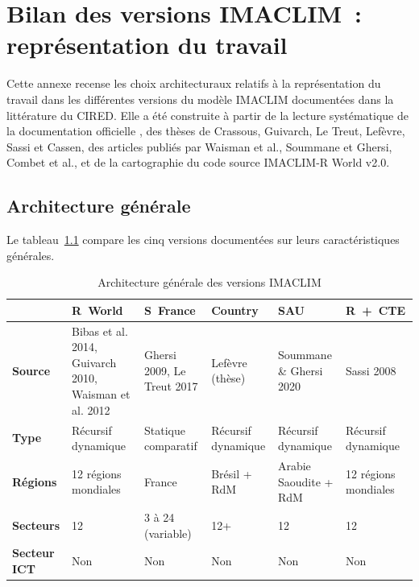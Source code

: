
\chapter{Bilan des versions IMACLIM~: représentation du travail}\label{ch:annexe-imaclim}

Cette annexe recense les choix architecturaux relatifs à la représentation du travail dans les différentes versions du modèle IMACLIM documentées dans la littérature du CIRED. Elle a été construite à partir de la lecture systématique de la documentation officielle \parencite{bibas_imaclim_2014}, des thèses de Crassous, Guivarch, Le Treut, Lefèvre, Sassi et Cassen, des articles publiés par Waisman et al., Soummane et Ghersi, Combet et al., et de la cartographie du code source IMACLIM-R World v2.0.

\section{Architecture générale}

Le tableau~\ref{tab:imaclim-archi} compare les cinq versions documentées sur leurs caractéristiques générales.

\begin{table}[htbp]
\centering
\caption{Architecture générale des versions IMACLIM}\label{tab:imaclim-archi}
\small
\begin{tabular}{p{2.8cm}p{2.2cm}p{2.2cm}p{2.2cm}p{2.2cm}p{2.2cm}}
\toprule
 & \textbf{R~World} & \textbf{S~France} & \textbf{Country} & \textbf{SAU} & \textbf{R~+~CTE} \\
\midrule
\textbf{Source} & Bibas et al. 2014, Guivarch 2010, Waisman et al. 2012 & Ghersi 2009, Le Treut 2017 & Lefèvre (thèse) & Soummane \& Ghersi 2020 & Sassi 2008 \\
\addlinespace
\textbf{Type} & Récursif dynamique & Statique comparatif & Récursif dynamique & Récursif dynamique & Récursif dynamique \\
\addlinespace
\textbf{Régions} & 12 régions mondiales & France & Brésil + RdM & Arabie Saoudite + RdM & 12 régions mondiales \\
\addlinespace
\textbf{Secteurs} & 12 & 3 à 24 (variable) & 12+ & 12 & 12 \\
\addlinespace
\textbf{Secteur ICT} & Non & Non & Non & Non & Non \\
\bottomrule
\end{tabular}
\end{table}

